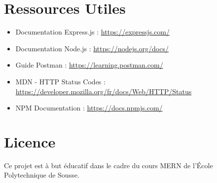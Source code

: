 \documentclass[12pt,a4paper]{article}
\begin{document}
\section{Ressources Utiles}

\begin{itemize}
    \item Documentation Express.js : \url{https://expressjs.com/}
    \item Documentation Node.js : \url{https://nodejs.org/docs/}
    \item Guide Postman : \url{https://learning.postman.com/}
    \item MDN - HTTP Status Codes : \url{https://developer.mozilla.org/fr/docs/Web/HTTP/Status}
    \item NPM Documentation : \url{https://docs.npmjs.com/}
\end{itemize}

\section{Licence}

Ce projet est à but éducatif dans le cadre du cours MERN de l'École Polytechnique de Sousse.
\end{document}
